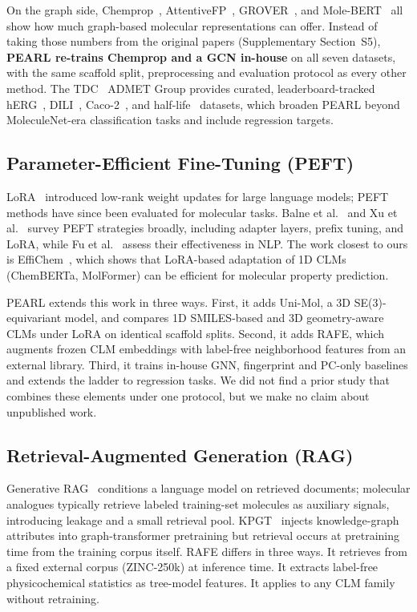 \documentclass[pdflatex,sn-mathphys-num]{sn-jnl}%
\begin{document}
On the graph side, Chemprop~\cite{yang2019chemprop}, AttentiveFP~\cite{xiong2020attentivefp}, GROVER~\cite{rong2020grover}, and Mole-BERT~\cite{xia2023molecbert} all show how much graph-based molecular representations can offer. Instead of taking those numbers from the original papers (Supplementary Section~S5), \textbf{PEARL re-trains Chemprop and a GCN in-house} on all seven datasets, with the same scaffold split, preprocessing and evaluation protocol as every other method. The TDC~\cite{huang2021tdc} ADMET Group provides curated, leaderboard-tracked hERG~\cite{wang2016herg}, DILI~\cite{xu2019dili}, Caco-2~\cite{wang2016caco2}, and half-life~\cite{obach2008half} datasets, which broaden PEARL beyond MoleculeNet-era classification tasks and include regression targets.

\subsection{Parameter-Efficient Fine-Tuning (PEFT)}\label{sec:related_peft}
LoRA~\cite{hu2021lora} introduced low-rank weight updates for large language models; PEFT methods have since been evaluated for molecular tasks. Balne et al.~\cite{balne2024peft} and Xu et al.~\cite{xu2023peftreview} survey PEFT strategies broadly, including adapter layers, prefix tuning, and LoRA, while Fu et al.~\cite{fu2023effectiveness} assess their effectiveness in NLP. The work closest to ours is EffiChem~\cite{harod2025effichem}, which shows that LoRA-based adaptation of 1D CLMs (ChemBERTa, MolFormer) can be efficient for molecular property prediction.

PEARL extends this work in three ways. First, it adds Uni-Mol, a 3D SE(3)-equivariant model, and compares 1D SMILES-based and 3D geometry-aware CLMs under LoRA on identical scaffold splits. Second, it adds RAFE, which augments frozen CLM embeddings with label-free neighborhood features from an external library. Third, it trains in-house GNN, fingerprint and PC-only baselines and extends the ladder to regression tasks. We did not find a prior study that combines these elements under one protocol, but we make no claim about unpublished work.

\subsection{Retrieval-Augmented Generation (RAG)}\label{sec:related_rag}
Generative RAG~\cite{lewis2020rag} conditions a language model on retrieved documents; molecular analogues typically retrieve labeled training-set molecules as auxiliary signals, introducing leakage and a small retrieval pool. KPGT~\cite{liu2022kpgt} injects knowledge-graph attributes into graph-transformer pretraining but retrieval occurs at pretraining time from the training corpus itself. RAFE differs in three ways. It retrieves from a fixed external corpus (ZINC-250k) at inference time. It extracts label-free physicochemical statistics as tree-model features. It applies to any CLM family without retraining.
\end{document}
